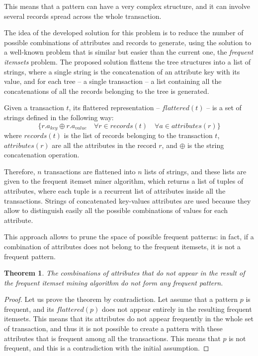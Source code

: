 \documentclass{acm_proc_article-sp-sigmod09}
\begin{document}
This means that a pattern can have a very complex structure, and it can involve several records spread across the whole transaction.

The idea of the developed solution for this problem is to reduce the number of possible combinations of attributes and records to generate, using the solution to a well-known problem that is similar but easier than the current one, the \emph{frequent itemsets} problem. The proposed solution flattens the tree structures into a list of strings, where a single string is the concatenation of an attribute key with its value, and for each tree -- a single transaction -- a list containing all the concatenations of all the records belonging to the tree is generated. 

\begin{definition}
Given a transaction $t$, its flattered representation -- $flattered(t)$ -- is a set of strings defined in the following way:
\[
\{r.a_{key} \oplus r.a_{value} \quad \forall r \in records(t) \quad \forall a \in attributes(r) \}
\]
where $records(t)$ is the list of records belonging to the transaction $t$, $attributes(r)$ are all the attributes in the record $r$, and $\oplus$ is the string concatenation operation.
\end{definition}

Therefore, $n$ transactions are flattened into $n$ lists of strings, and these lists are given to the frequent itemset miner algorithm, which returns a list of tuples of attributes, where each tuple is a recurrent list of attributes inside all the transactions. Strings of concatenated key-values attributes are used because they allow to distinguish easily all the possible combinations of values for each attribute.

This approach allows to prune the space of possible frequent patterns: in fact, if a combination of attributes does not belong to the frequent itemsets, it is not a frequent pattern.

\newtheorem{theorem}{Theorem}
\begin{theorem}
The combinations of attributes that do not appear in the result of the frequent itemset mining algorithm do not form any frequent pattern.
\end{theorem}

\begin{proof}
Let us prove the theorem by contradiction. Let assume that a pattern $p$ is frequent, and its $flattered(p)$ does not appear entirely in the resulting frequent itemsets. This means that its attributes do not appear frequently in the whole set of transaction, and thus it is not possible to create a pattern with these attributes that is frequent among all the transactions. This means that $p$ is not frequent, and this is a contradiction with the initial assumption.
\end{proof}
\end{document}
